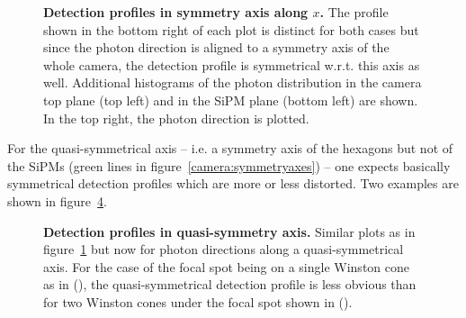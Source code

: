 \begin{figure}[H]
	\centering
	\begin{subfigure}[t]{0.492\textwidth}
	\end{subfigure}
	\hfill
	\begin{subfigure}[t]{0.492\textwidth}
	\end{subfigure}
	\caption[Detection profiles in symmetry axis along $x$]{\textbf{Detection profiles in symmetry axis along $x$.} The profile shown in the bottom right of each plot is distinct for both cases but since the photon direction is aligned to a symmetry axis of the whole camera, the detection profile is symmetrical w.r.t. this axis as well. Additional histograms of the photon distribution in the camera top plane (top left) and in the SiPM plane (bottom left) are shown. In the top right, the photon direction is plotted.}
	\label{alienplots_normalsym}
\end{figure}

For the quasi-symmetrical axis -- i.e. a symmetry axis of the hexagons but not of the SiPMs (green lines in figure~\ref{camera:symmetryaxes}) -- one expects basically symmetrical detection profiles which are more or less distorted. Two examples are shown in figure~\ref{alienplots_quasisym}.\\

\begin{figure}[H]
	\centering	
	\begin{subfigure}[t]{0.492\textwidth}
		\label{alienplots_quasisym:1}
	\end{subfigure}
	\hfill
	\begin{subfigure}[t]{0.492\textwidth}
		\label{alienplots_quasisym:2}
	\end{subfigure}
	\caption[Detection profiles in quasi-symmetry axis]{\textbf{Detection profiles in quasi-symmetry axis.} Similar plots as in figure~\ref{alienplots_normalsym} but now for photon directions along a quasi-symmetrical axis. For the case of the focal spot being on a single Winston cone as in (), the quasi-symmetrical detection profile is less obvious than for two Winston cones under the focal spot shown in ().}
	\label{alienplots_quasisym}
\end{figure}

